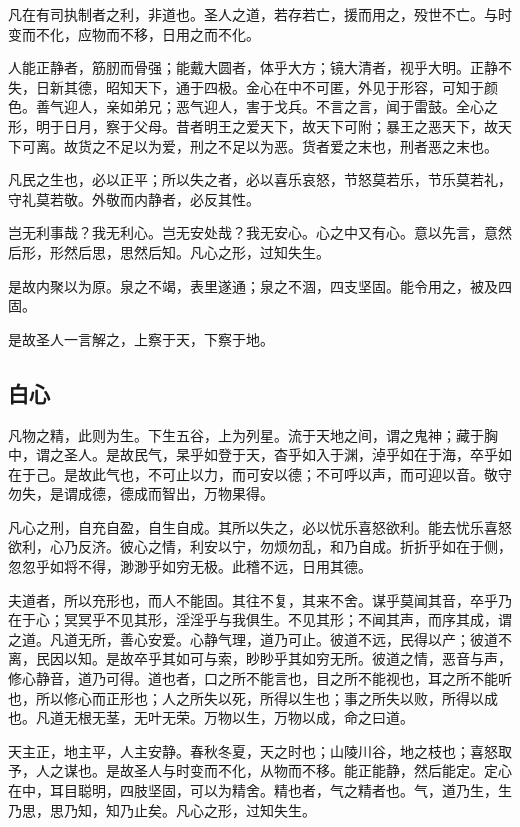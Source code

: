 凡在有司执制者之利，非道也。圣人之道，若存若亡，援而用之，殁世不亡。与时变而不化，应物而不移，日用之而不化。

人能正静者，筋肕而骨强；能戴大圆者，体乎大方；镜大清者，视乎大明。正静不失，日新其德，昭知天下，通于四极。金心在中不可匿，外见于形容，可知于颜色。善气迎人，亲如弟兄；恶气迎人，害于戈兵。不言之言，闻于雷鼓。全心之形，明于日月，察于父母。昔者明王之爱天下，故天下可附；暴王之恶天下，故天下可离。故货之不足以为爱，刑之不足以为恶。货者爱之末也，刑者恶之末也。

凡民之生也，必以正平；所以失之者，必以喜乐哀怒，节怒莫若乐，节乐莫若礼，守礼莫若敬。外敬而内静者，必反其性。

岂无利事哉？我无利心。岂无安处哉？我无安心。心之中又有心。意以先言，意然后形，形然后思，思然后知。凡心之形，过知失生。

是故内聚以为原。泉之不竭，表里遂通；泉之不涸，四支坚固。能令用之，被及四固。

是故圣人一言解之，上察于天，下察于地。

\subsection{白心}

凡物之精，此则为生。下生五谷，上为列星。流于天地之间，谓之鬼神；藏于胸中，谓之圣人。是故民气，杲乎如登于天，杳乎如入于渊，淖乎如在于海，卒乎如在于己。是故此气也，不可止以力，而可安以德；不可呼以声，而可迎以音。敬守勿失，是谓成德，德成而智出，万物果得。

凡心之刑，自充自盈，自生自成。其所以失之，必以忧乐喜怒欲利。能去忧乐喜怒欲利，心乃反济。彼心之情，利安以宁，勿烦勿乱，和乃自成。折折乎如在于侧，忽忽乎如将不得，渺渺乎如穷无极。此稽不远，日用其德。

夫道者，所以充形也，而人不能固。其往不复，其来不舍。谋乎莫闻其音，卒乎乃在于心；冥冥乎不见其形，淫淫乎与我俱生。不见其形；不闻其声，而序其成，谓之道。凡道无所，善心安爱。心静气理，道乃可止。彼道不远，民得以产；彼道不离，民因以知。是故卒乎其如可与索，眇眇乎其如穷无所。彼道之情，恶音与声，修心静音，道乃可得。道也者，口之所不能言也，目之所不能视也，耳之所不能听也，所以修心而正形也；人之所失以死，所得以生也；事之所失以败，所得以成也。凡道无根无茎，无叶无荣。万物以生，万物以成，命之曰道。

天主正，地主平，人主安静。春秋冬夏，天之时也；山陵川谷，地之枝也；喜怒取予，人之谋也。是故圣人与时变而不化，从物而不移。能正能静，然后能定。定心在中，耳目聪明，四肢坚固，可以为精舍。精也者，气之精者也。气，道乃生，生乃思，思乃知，知乃止矣。凡心之形，过知失生。

